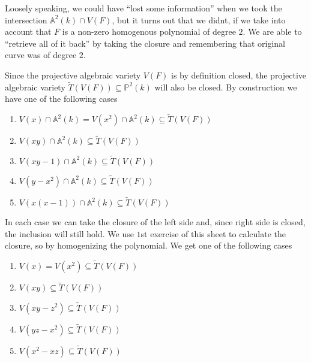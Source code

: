 \begin{exercise}{2}
\begin{enumerate}
            Loosely speaking, we could have ``lost some information'' when we
            took the intersection $\mathbb{A}^2(k) \cap V(F)$, but it turns out
            that we didnt, if we take into account that $F$ is a non-zero
            homogenous polynomial of degree $2$. We are able to ``retrieve all
            of it back'' by taking the closure and remembering that original
            curve was of degree $2$.

            Since the projective algebraic variety $V(F)$ is by definition
            closed, the projective algebraic variety $\widetilde{T}(V(F))
            \subseteq \mathbb{P}^2(k)$ will also be closed. By construction we
            have one of the following cases
            \begin{enumerate}
                \item{} $V(x) \cap \mathbb{A}^2(k) = V(x^2) \cap \mathbb{A}^2(k)
                    \subseteq \widetilde{T}(V(F))$
                \item{} $V(xy) \cap \mathbb{A}^2(k) \subseteq
                    \widetilde{T}(V(F))$
                \item{} $V(xy - 1) \cap \mathbb{A}^2(k) \subseteq
                    \widetilde{T}(V(F))$
                \item{} $V(y - x^2) \cap \mathbb{A}^2(k) \subseteq
                    \widetilde{T}(V(F))$
                \item{} $V(x(x - 1)) \cap \mathbb{A}^2(k) \subseteq
                    \widetilde{T}(V(F))$
            \end{enumerate}
            In each case we can take the closure of the left side and, since
            right side is closed, the inclusion will still hold. We use $1$st
            exercise of this sheet to calculate the closure, so by homogenizing
            the polynomial. We get one of the following cases
            \begin{enumerate}
                \item{} $V(x) = V(x^2) \subseteq \widetilde{T}(V(F))$
                \item{} $V(xy) \subseteq \widetilde{T}(V(F))$
                \item{} $V(xy - z^2) \subseteq \widetilde{T}(V(F))$
                \item{} $V(yz - x^2) \subseteq \widetilde{T}(V(F))$
                \item{} $V(x^2 - xz) \subseteq \widetilde{T}(V(F))$
            \end{enumerate}

\end{enumerate}
\end{exercise}
